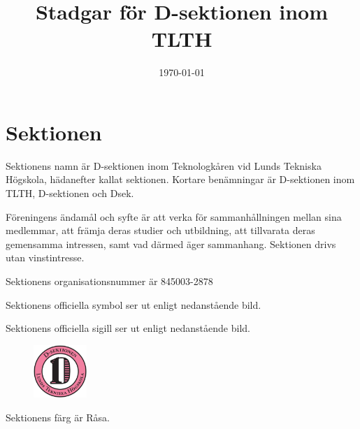 \documentclass[stadgar]{dsekprotokoll}
\begin{document}
\title{Stadgar för D-sektionen inom TLTH}
\date{\today}

\maketitle

\section{Sektionen}

\begin{stadgeavsnitt}


Sektionens namn är D-sektionen inom Teknologkåren vid Lunds Tekniska Högskola, hädanefter kallat sektionen. Kortare benämningar är D-sektionen inom TLTH, D-sektionen och Dsek.


Föreningens ändamål och syfte är att verka för sammanhållningen mellan sina
medlemmar, att främja deras studier och utbildning, att tillvarata deras
gemensamma intressen, samt vad därmed äger sammanhang. Sektionen drivs utan
vinstintresse.

Sektionens organisationsnummer är 845003-2878\\


Sektionens officiella symbol ser ut enligt nedanstående bild.

\tthdump{\Dsymbol[10mm]}


Sektionens officiella sigill ser ut enligt nedanstående bild. 
\begin{figure}[htb]
\begin{adjustwidth}{5cm}{0cm}
\includegraphics[height=20mm,width=20 mm]{sigill.pdf}
\end{adjustwidth}
\end{figure}



Sektionens färg är Råsa.



\end{stadgeavsnitt}
\end{document}
